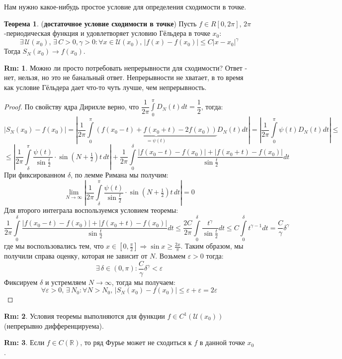 \documentclass[12pt]{article}
\newcommand{\MR}{\mathbb{R}}
\newcommand{\MU}{\mathcal{U}}
\newcommand{\VE}{\varepsilon}
\theoremstyle{definition}
\newtheorem{rem}{Rm:}
\newtheorem{theorem}{Теорема}
\newcommand{\ddint}[2]{\displaystyle\int\limits_{#1}^{#2}}
\begin{document}
Нам нужно какое-нибудь простое условие для определения сходимости в точке.
\begin{theorem}(\textbf{достаточное условие сходимости в точке})
	Пусть $f \in R[0,2\pi]$, $2\pi$-периодическая функция и удовлетворяет условию Гёльдера в точке $x_0$:
	$$
		\exists \, \MU(x_0), \, \exists \, C> 0, \gamma > 0 \colon \forall x \in \MU(x_0), \, |f(x) - f(x_0)| \leq C|x - x_0|^\gamma 
	$$
	Тогда $S_N(x_0) \to f(x_0)$.
\end{theorem}
\begin{rem}
	Можно ли просто потребовать непрерывности для сходимости? Ответ - нет, нельзя, но это не банальный ответ. Непрерывности не хватает, в то время как условие Гёльдера дает что-то чуть лучше, чем непрерывность.
\end{rem}
\begin{proof}
	По свойству ядра Дирихле верно, что $\dfrac{1}{2\pi}\ddint{0}{\pi}D_N(t)dt = \dfrac{1}{2}$, тогда:
	$$
		|S_N(x_0) - f(x_0)| = \left|\dfrac{1}{2\pi}\ddint{0}{\pi}\underbrace{\left(f(x_0 - t) + f(x_0 +t) - 2f(x_0)\right)}_{= \psi(t)}D_N(t)dt\right| = \left|\dfrac{1}{2\pi}\ddint{0}{\pi}\psi(t)D_N(t)dt\right| \leq
	$$
	$$
		\leq \left|\dfrac{1}{2\pi}\ddint{\delta}{\pi}\dfrac{\psi(t)}{\sin{\tfrac{t}{2}}}{\cdot}\sin{\left(N + \tfrac{1}{2}\right)t} \, dt\right| + \dfrac{1}{2\pi}\ddint{0}{\delta}\dfrac{|f(x_0 - t) - f(x_0)| + |f(x_0 + t) - f(x_0)|}{\sin{\tfrac{t}{2}}}dt
	$$
	При фиксированном $\delta$, по лемме Римана мы получим:
	$$
		\lim\limits_{N \to \infty}\left|\dfrac{1}{2\pi}\ddint{\delta}{\pi}\dfrac{\psi(t)}{\sin{\tfrac{t}{2}}}{\cdot}\sin{\left(N + \tfrac{1}{2}\right)t} \, dt\right| = 0
	$$
	Для второго интеграла воспользуемся условием теоремы:
	$$
		\dfrac{1}{2\pi}\ddint{0}{\delta}\dfrac{|f(x_0 - t) - f(x_0)| + |f(x_0 + t) - f(x_0)|}{\sin{\tfrac{t}{2}}}dt \leq \dfrac{2C}{2\pi}\ddint{0}{\delta}\dfrac{t^{\gamma}}{\sin{\tfrac{t}{2}}}dt \leq C \ddint{0}{\delta}t^{\gamma - 1}dt = \dfrac{C}{\gamma}\delta^\gamma
	$$
	где мы воспользовались тем, что $x \in \left[0,\tfrac{\pi}{2}\right] \Rightarrow \sin{x} \geq \tfrac{2x}{\pi}$. Таким образом, мы получили справа оценку, которая не зависит от $N$. Возьмем $\VE > 0$ тогда:
	$$
		\exists \, \delta \in (0,\pi) \colon \dfrac{C}{\gamma}\delta^\gamma < \VE
	$$
	Фиксируем $\delta$ и устремляем $N \to \infty$, тогда мы получаем:
	$$
		\forall \VE > 0, \, \exists \, N_0 \colon \forall N > N_0, \, |S_N(x_0) - f(x_0)| \leq \VE + \VE = 2\VE
	$$
\end{proof}

\begin{rem}
	Условия теоремы выполняются для функции $f \in C^1(\MU(x_0))$ (непрерывно дифференцируема).
\end{rem}
\begin{rem}
	Если $f \in C(\MR)$, то ряд Фурье может не сходиться к $f$ в данной точке $x_0$.
\end{rem}
\end{document}
